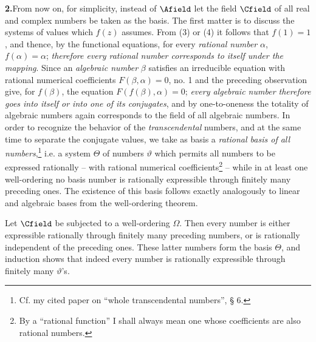 \documentclass[11pt]{article}
\begin{document}
\medskip
\noindent\textbf{2.}\quad From now on, for simplicity, instead of \(\Afield\) let the field \(\Cfield\) of all real and complex numbers be taken as the basis. The first matter is to discuss the systems of values which \(f(z)\) assumes. From (3) or (4) it follows that \(f(1)=1\), and thence, by the functional equations, for every \emph{rational number} \(\alpha\), \(f(\alpha)=\alpha\); \emph{therefore every rational number corresponds to itself under the mapping}. Since an \emph{algebraic number} \(\beta\) satisfies an irreducible equation with rational numerical coefficients \(F(\beta,\alpha)=0\), no. 1 and the preceding observation give, for \(f(\beta)\), the equation \(F(f(\beta),\alpha)=0\); \emph{every algebraic number therefore goes into itself or into one of its conjugates}, and by one-to-oneness the totality of algebraic numbers again corresponds to the field of all algebraic numbers. In order to recognize the behavior of the \emph{transcendental} numbers, and at the same time to separate the conjugate values, we take as basis a \emph{rational basis of all numbers},\footnote{Cf. my cited paper on ``whole transcendental numbers'', § 6.} i.e. a system \(\Theta\) of numbers \(\vartheta\) which permits all numbers to be expressed rationally -- with rational numerical coefficients\footnote{By a ``rational function'' I shall always mean one whose coefficients are also rational numbers.} -- while in at least one well-ordering no basis number is rationally expressible through finitely many preceding ones. The existence of this basis follows exactly analogously to linear and algebraic bases from the well-ordering theorem.

Let \(\Cfield\) be subjected to a well-ordering \(\Omega\). Then every number is either expressible rationally through finitely many preceding numbers, or is rationally independent of the preceding ones. These latter numbers form the basis \(\Theta\), and induction shows that indeed every number is rationally expressible through finitely many \(\vartheta\)'s.
\end{document}

